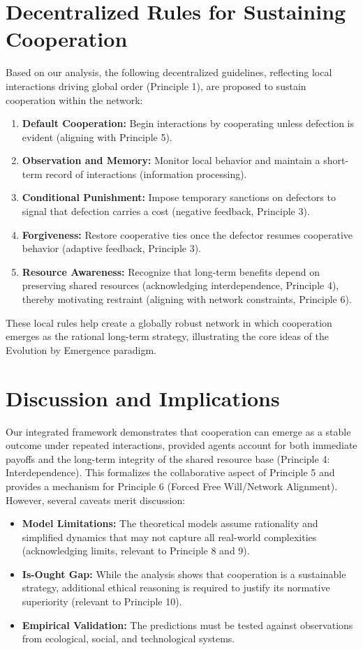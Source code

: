 \documentclass[12pt,openany]{book}
\begin{document}
\section{Decentralized Rules for Sustaining Cooperation}
Based on our analysis, the following decentralized guidelines, reflecting local interactions driving global order (Principle 1), are proposed to sustain cooperation within the network:
\begin{enumerate}
    \item \textbf{Default Cooperation:} Begin interactions by cooperating unless defection is evident (aligning with Principle 5).
    \item \textbf{Observation and Memory:} Monitor local behavior and maintain a short-term record of interactions (information processing).
    \item \textbf{Conditional Punishment:} Impose temporary sanctions on defectors to signal that defection carries a cost (negative feedback, Principle 3).
    \item \textbf{Forgiveness:} Restore cooperative ties once the defector resumes cooperative behavior (adaptive feedback, Principle 3).
    \item \textbf{Resource Awareness:} Recognize that long-term benefits depend on preserving shared resources (acknowledging interdependence, Principle 4), thereby motivating restraint (aligning with network constraints, Principle 6).
\end{enumerate}
These local rules help create a globally robust network in which cooperation emerges as the rational long-term strategy, illustrating the core ideas of the Evolution by Emergence paradigm. %

\section{Discussion and Implications}
Our integrated framework demonstrates that cooperation can emerge as a stable outcome under repeated interactions, provided agents account for both immediate payoffs and the long-term integrity of the shared resource base (Principle 4: Interdependence). This formalizes the collaborative aspect of Principle 5 and provides a mechanism for Principle 6 (Forced Free Will/Network Alignment). However, several caveats merit discussion:
\begin{itemize}
    \item \textbf{Model Limitations:} The theoretical models assume rationality and simplified dynamics that may not capture all real-world complexities (acknowledging limits, relevant to Principle 8 and 9).
    \item \textbf{Is-Ought Gap:} While the analysis shows that cooperation is a sustainable strategy, additional ethical reasoning is required to justify its normative superiority (relevant to Principle 10).
    \item \textbf{Empirical Validation:} The predictions must be tested against observations from ecological, social, and technological systems.
\end{itemize} %
\end{document}
